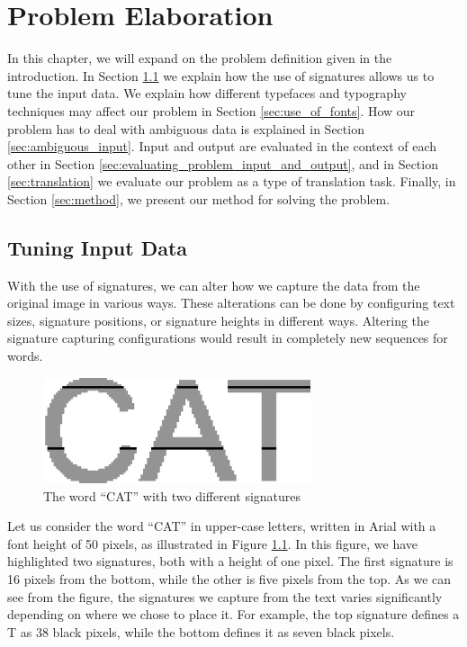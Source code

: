 
\chapter{Problem Elaboration}
\label{ch:problem}
In this chapter, we will expand on the problem definition given in the introduction. In Section \ref{sec:tuning_input_data} we explain how the use of signatures allows us to tune the input data. We explain how different typefaces and typography techniques may affect our problem in Section \ref{sec:use_of_fonts}. How our problem has to deal with ambiguous data is explained in Section \ref{sec:ambiguous_input}. Input and output are evaluated in the context of each other in Section \ref{sec:evaluating_problem_input_and_output}, and in Section \ref{sec:translation} we evaluate our problem as a type of translation task. Finally, in Section \ref{sec:method}, we present our method for solving the problem.


\section{Tuning Input Data}
\label{sec:tuning_input_data}
With the use of signatures, we can alter how we capture the data from the original image in various ways. These alterations can be done by configuring text sizes, signature positions, or signature heights in different ways. Altering the signature capturing configurations would result in completely new sequences for words.

\begin{figure}[ht]
    \centering
    \includegraphics[width=0.7\textwidth]{fig/chapter2/signature_multiple.png}
    \caption{The word ``CAT'' with two different signatures}
    \label{fig:thesis-signature-comparison}
\end{figure}

Let us consider the word ``CAT'' in upper-case letters, written in Arial with a font height of 50 pixels, as illustrated in Figure \ref{fig:thesis-signature-comparison}. In this figure, we have highlighted two signatures, both with a height of one pixel. The first signature is 16 pixels from the bottom, while the other is five pixels from the top. As we can see from the figure, the signatures we capture from the text varies significantly depending on where we chose to place it. For example, the top signature defines a T as 38 black pixels, while the bottom defines it as seven black pixels.

